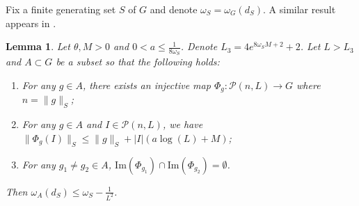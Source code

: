 \documentclass{amsart}
\numberwithin{thm}{section}
\numberwithin{figure}{section}
\newtheorem{lem}[thm]{Lemma}
\theoremstyle{definition}
\theoremstyle{definition}
\theoremstyle{remark}
\numberwithin{equation}{section}
\theoremstyle{plain}
\begin{document}
Fix  a finite generating set  $S$ of $G$ and denote $\omega_S = \omega_G(d_{S})$.  
A similar result appears in \cite[Lemma 2.26]{DY24:GrowthTight}.

\begin{lem}\label{gapCritLem}
	Let $\theta, M>0$ and $0<a \le \frac{1}{8\omega_S}$. Denote  $L_3 = 4 e^{8\omega_S M + 2} + 2$.  Let $L > L_3$ and  $A\subset G$ be a subset  so that the following holds:
	\begin{enumerate}
		\item \label{Conditiondelta} For any $g\in A$, there exists an injective map $\Phi_g: \mathcal{P}(n, L) \to G$ where $n = \|g\|_S$;
		\item \label{ConditionL} For any $g\in A$ and $I\in \mathcal{P}(n, L)$, we have $\|\Phi_g(I)\|_S \le \|g\|_S + |I| (a  \log(L) + M)$;
		\item \label{ConditionD} For any $g_1 \neq  g_2\in A$, $\mathrm{Im}(\Phi_{g_1}) \cap \mathrm{Im}(\Phi_{g_2}) = \emptyset$.
	\end{enumerate}
	Then $\omega_A(d_{S}) \le \omega_S - \frac{1}{L^2}$.
\end{lem}
\end{document}
